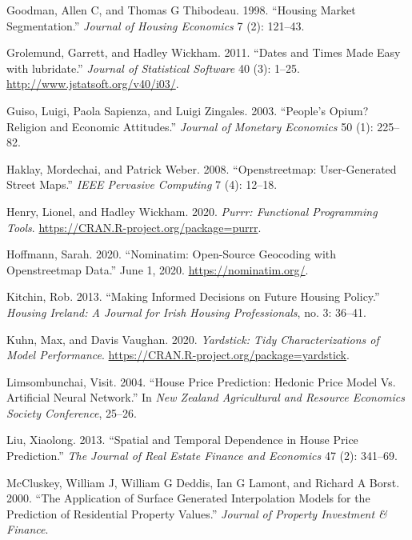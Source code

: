 \documentclass[conference,final,]{IEEEtran}
\newlength{\cslhangindent}
\newenvironment{cslreferences}%
  {\setlength{\parindent}{0pt}%
  \everypar{\setlength{\hangindent}{\cslhangindent}}\ignorespaces}%
  {\par}
\begin{document}
\begin{cslreferences}
\leavevmode\hypertarget{ref-goodman1998housing}{}%
Goodman, Allen C, and Thomas G Thibodeau. 1998. ``Housing Market Segmentation.'' \emph{Journal of Housing Economics} 7 (2): 121--43.

\leavevmode\hypertarget{ref-R-lubridate}{}%
Grolemund, Garrett, and Hadley Wickham. 2011. ``Dates and Times Made Easy with lubridate.'' \emph{Journal of Statistical Software} 40 (3): 1--25. \url{http://www.jstatsoft.org/v40/i03/}.

\leavevmode\hypertarget{ref-guiso2003people}{}%
Guiso, Luigi, Paola Sapienza, and Luigi Zingales. 2003. ``People's Opium? Religion and Economic Attitudes.'' \emph{Journal of Monetary Economics} 50 (1): 225--82.

\leavevmode\hypertarget{ref-haklay2008openstreetmap}{}%
Haklay, Mordechai, and Patrick Weber. 2008. ``Openstreetmap: User-Generated Street Maps.'' \emph{IEEE Pervasive Computing} 7 (4): 12--18.

\leavevmode\hypertarget{ref-R-purrr}{}%
Henry, Lionel, and Hadley Wickham. 2020. \emph{Purrr: Functional Programming Tools}. \url{https://CRAN.R-project.org/package=purrr}.

\leavevmode\hypertarget{ref-nominatim2020}{}%
Hoffmann, Sarah. 2020. ``Nominatim: Open-Source Geocoding with Openstreetmap Data.'' June 1, 2020. \url{https://nominatim.org/}.

\leavevmode\hypertarget{ref-kitchin2013making}{}%
Kitchin, Rob. 2013. ``Making Informed Decisions on Future Housing Policy.'' \emph{Housing Ireland: A Journal for Irish Housing Professionals}, no. 3: 36--41.

\leavevmode\hypertarget{ref-R-yardstick}{}%
Kuhn, Max, and Davis Vaughan. 2020. \emph{Yardstick: Tidy Characterizations of Model Performance}. \url{https://CRAN.R-project.org/package=yardstick}.

\leavevmode\hypertarget{ref-limsombunchai2004house}{}%
Limsombunchai, Visit. 2004. ``House Price Prediction: Hedonic Price Model Vs. Artificial Neural Network.'' In \emph{New Zealand Agricultural and Resource Economics Society Conference}, 25--26.

\leavevmode\hypertarget{ref-liu2013spatial}{}%
Liu, Xiaolong. 2013. ``Spatial and Temporal Dependence in House Price Prediction.'' \emph{The Journal of Real Estate Finance and Economics} 47 (2): 341--69.

\leavevmode\hypertarget{ref-mccluskey2000application}{}%
McCluskey, William J, William G Deddis, Ian G Lamont, and Richard A Borst. 2000. ``The Application of Surface Generated Interpolation Models for the Prediction of Residential Property Values.'' \emph{Journal of Property Investment \& Finance}.


\end{cslreferences}
\end{document}
